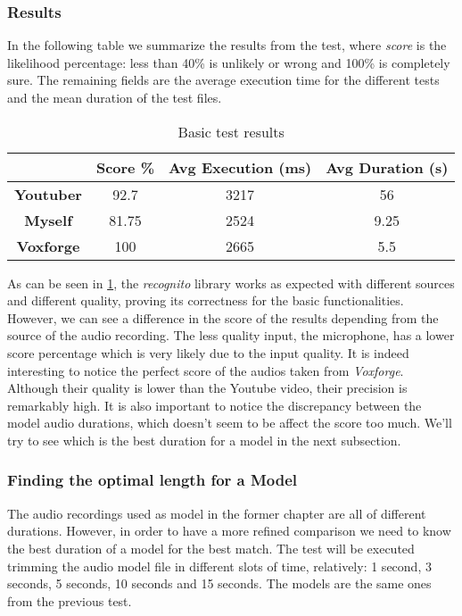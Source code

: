 \subsubsection{Results}

In the following table we summarize the results from the test, where \textit{score} is the
likelihood percentage: less than 40\% is unlikely or wrong and 100\% is completely sure.
The remaining fields are the average execution time for the different tests and the mean duration
of the test files.
\begin{table}
    \label{tab:basicres}
\centering
\caption{Basic test results}
\begin{tabular}{|c|c|c|c|} \hline
& \textbf{Score \%} & \textbf{Avg Execution (ms)} & \textbf{Avg Duration (s)}\\ \hline
\textbf{Youtuber} & 92.7 & 3217 & 56 \\ \hline
\textbf{Myself} & 81.75 & 2524 & 9.25  \\ \hline
\textbf{Voxforge} & 100 & 2665 & 5.5  \\ \hline
\end{tabular}
\end{table}

As can be seen in \ref{tab:basicres}, the \textit{recognito} library works as expected with
different sources and different quality, proving its correctness for the basic functionalities.
However, we can see a difference in the score of the results depending from the source of the
audio recording. The less quality input, the microphone, has a lower score percentage which is very likely
due to the input quality. It is indeed interesting to notice the perfect score of the audios
taken from \textit{Voxforge}. Although their quality is lower than the Youtube video, their
precision is remarkably high. It is also important to notice the discrepancy between the model
audio durations, which doesn't seem to be affect the score too much. We'll try
to see which is the best duration for a model in the next subsection.

\subsubsection{Finding the optimal length for a Model}

The audio recordings used as model in the former chapter are all of different durations.
However, in order to have a more refined comparison we need to know the best duration of a model
for the best match.\newline
The test will be executed trimming the audio model file in different slots of time, relatively:
1 second, 3 seconds, 5 seconds, 10 seconds and 15 seconds. The models are the same ones
from the previous test.
\pgfplotsset{width=10cm,compat=1.9}

